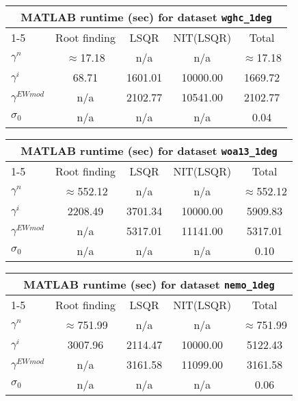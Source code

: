 \documentclass[12pt,a4paper]{article}
\author{}
\date{}
\begin{document}
\setlength{\parindent}{0cm}




 
 \begin{table} 
 \centering 
 \begin{tabular}{lcccc} 
 \toprule 
 \multicolumn{5}{c}{MATLAB runtime (sec) for dataset \lstinline{wghc_1deg}}  \\
 \cmidrule{1-5} 
 & {Root finding   }& {  LSQR   } &  {NIT(LSQR)} & {  Total   }\\ 
 \cmidrule{2-5} 
 $\gamma^n$ & $\approx$17.18 & n/a & n/a & $\approx$17.18 \\
 $\gamma^i$ & 68.71 & 1601.01 & 10000.00 & 1669.72\\
 $\gamma^{EWmod}$ &  n/a  & 2102.77 & 10541.00 & 2102.77 \\
 $\sigma_0$ &  n/a  &  n/a &  n/a  & 0.04 \\
 \end{tabular} 
 \end{table} 
 
 
 \begin{table} 
 \centering 
 \begin{tabular}{lcccc} 
 \toprule 
 \multicolumn{5}{c}{MATLAB runtime (sec) for dataset \lstinline{woa13_1deg}}  \\
 \cmidrule{1-5} 
 & {Root finding   }& {  LSQR   } &  {NIT(LSQR)} & {  Total   }\\ 
 \cmidrule{2-5} 
 $\gamma^n$ & $\approx$552.12 & n/a & n/a & $\approx$552.12 \\
 $\gamma^i$ & 2208.49 & 3701.34 & 10000.00 & 5909.83\\
 $\gamma^{EWmod}$ &  n/a  & 5317.01 & 11141.00 & 5317.01 \\
 $\sigma_0$ &  n/a  &  n/a &  n/a  & 0.10 \\
 \end{tabular} 
 \end{table} 
 
 
 \begin{table} 
 \centering 
 \begin{tabular}{lcccc} 
 \toprule 
 \multicolumn{5}{c}{MATLAB runtime (sec) for dataset \lstinline{nemo_1deg}}  \\
 \cmidrule{1-5} 
 & {Root finding   }& {  LSQR   } &  {NIT(LSQR)} & {  Total   }\\ 
 \cmidrule{2-5} 
 $\gamma^n$ & $\approx$751.99 & n/a & n/a & $\approx$751.99 \\
 $\gamma^i$ & 3007.96 & 2114.47 & 10000.00 & 5122.43\\
 $\gamma^{EWmod}$ &  n/a  & 3161.58 & 11099.00 & 3161.58 \\
 $\sigma_0$ &  n/a  &  n/a &  n/a  & 0.06 \\
 \end{tabular} 
 \end{table} 
 


\end{document}

